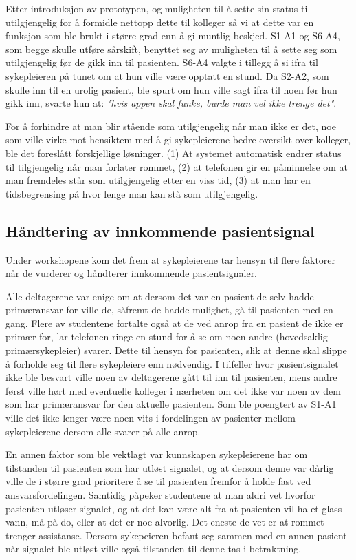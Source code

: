 \noindent
Etter introduksjon av prototypen, og muligheten til å sette sin status til  utilgjengelig for å formidle nettopp dette til kolleger så vi at dette var en funksjon som ble brukt i større grad enn å gi muntlig beskjed.
S1-A1 og S6-A4, som begge skulle utføre sårskift, benyttet seg av muligheten til å sette seg som utilgjengelig før de gikk inn til pasienten. S6-A4 valgte i tillegg å si ifra til sykepleieren på tunet om at hun ville være opptatt en stund. Da S2-A2, som skulle inn til en urolig pasient, ble spurt om hun ville sagt ifra til noen før hun gikk inn, svarte hun at: \emph{"hvis appen skal funke, burde man vel ikke trenge det"}.

\noindent
For å forhindre at man blir stående som utilgjengelig når man ikke er det, noe som ville virke mot hensiktem med å gi sykepleierene bedre oversikt over kolleger, ble det foreslått forskjellige løsninger. (1) At systemet automatisk endrer status til tilgjengelig når man forlater rommet, (2) at telefonen gir en påminnelse om at man fremdeles står som utilgjengelig etter en viss tid, (3) at man har en tidsbegrensing på hvor lenge man kan stå som utilgjengelig.


\subsection{Håndtering av innkommende pasientsignal}
Under workshopene kom det frem at sykepleierene tar hensyn til flere faktorer når de vurderer og håndterer innkommende pasientsignaler. 

\noindent
Alle deltagerene var enige om at dersom det var en pasient de selv hadde primæransvar for ville de, såfremt de hadde mulighet, gå til pasienten med en gang.
Flere av studentene fortalte også at de ved anrop fra en pasient de ikke er primær for, lar telefonen ringe en stund for å se om noen andre (hovedsaklig primærsykepleier) svarer. Dette til hensyn for pasienten, slik at denne skal slippe å forholde seg til flere sykepleiere enn nødvendig. I tilfeller hvor pasientsignalet ikke ble besvart ville noen av deltagerene gått til inn til pasienten, mens andre først ville hørt med eventuelle kolleger i nærheten om det ikke var noen av dem som har primæransvar for den aktuelle pasienten. Som ble poengtert av S1-A1 ville det ikke lenger være noen vits i fordelingen av pasienter mellom sykepleierene dersom alle svarer på alle anrop.

\noindent
En annen faktor som ble vektlagt var kunnskapen sykepleierene har om tilstanden til pasienten som har utløst signalet, og at dersom denne var dårlig ville de i større grad prioritere å se til pasienten fremfor å holde fast ved ansvarsfordelingen. Samtidig påpeker studentene at man aldri vet hvorfor pasienten utløser signalet, og at det kan være alt fra at pasienten vil ha et glass vann, må på do, eller at det er noe alvorlig. Det eneste de vet er at rommet trenger assistanse.  
Dersom sykepeieren befant seg sammen med en annen pasient når signalet ble utløst ville også tilstanden til denne tas i betraktning. 

